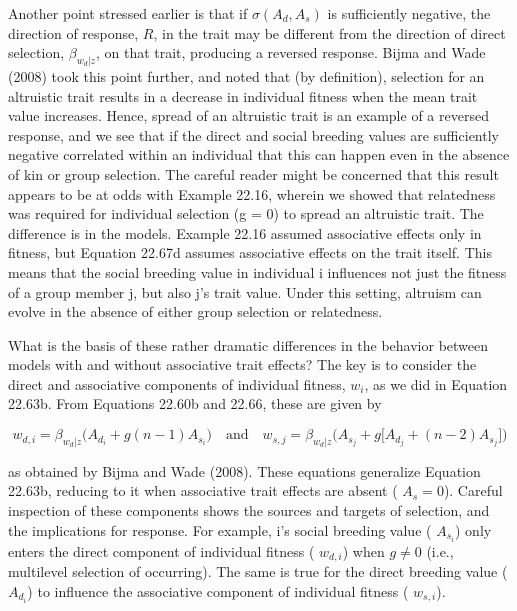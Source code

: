 \documentclass{article}
\begin{document}
Another point stressed earlier is that if  $ \sigma(A_d, A_s) $ is sufficiently negative, the direction of response,  $ R $, in the trait may be different from the direction of direct selection,  $ \beta_{w_d|z} $, on that trait, producing a reversed response. Bijma and Wade (2008) took this point further, and noted that (by definition), selection for an altruistic trait results in a decrease in individual fitness when the mean trait value increases. Hence, spread of an altruistic trait is an example of a reversed response, and we see that if the direct and social breeding values are sufficiently negative correlated within an individual that this can happen even in the absence of kin or group selection. The careful reader might be concerned that this result appears to be at odds with Example 22.16, wherein we showed that relatedness was required for individual selection (g = 0) to spread an altruistic trait. The difference is in the models. Example 22.16 assumed associative effects only in fitness, but Equation 22.67d assumes associative effects on the trait itself. This means that the social breeding value in individual i influences not just the fitness of a group member j, but also j's trait value. Under this setting, altruism can evolve in the absence of either group selection or relatedness.

What is the basis of these rather dramatic differences in the behavior between models with and without associative trait effects? The key is to consider the direct and associative components of individual fitness,  $ w_{i} $, as we did in Equation 22.63b. From Equations 22.60b and 22.66, these are given by

\begin{equation}
w_{d,i}=\beta_{w_{d}|z}\big(A_{d_{i}}+g(n-1)A_{s_{i}}\big)\quad\mathrm{a n d}\quad w_{s,j}=\beta_{w_{d}|z}\big(A_{s_{j}}+g\big[A_{d_{j}}+(n-2)A_{s_{j}}\big]\big)
\tag{22.68}
\label{eq:22_68}
\end{equation}

as obtained by Bijma and Wade (2008). These equations generalize Equation 22.63b, reducing to it when associative trait effects are absent ( $ A_s = 0 $). Careful inspection of these components shows the sources and targets of selection, and the implications for response. For example, i's social breeding value ( $ A_{s_i} $) only enters the direct component of individual fitness ( $ w_{d,i} $) when  $ g \neq 0 $ (i.e., multilevel selection of occurring). The same is true for the direct breeding value ( $ A_{d_i} $) to influence the associative component of individual fitness ( $ w_{s,i} $).
\end{document}

